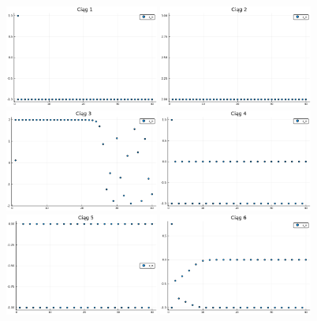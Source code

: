\documentclass{article}
\begin{document}
\begin{figure}
\includegraphics[width=0.45\textwidth]{img/t6plots/1.png}
\includegraphics[width=0.45\textwidth]{img/t6plots/2.png}
\includegraphics[width=0.45\textwidth]{img/t6plots/3.png}
\includegraphics[width=0.45\textwidth]{img/t6plots/4.png}
\includegraphics[width=0.45\textwidth]{img/t6plots/5.png}
\includegraphics[width=0.45\textwidth]{img/t6plots/6.png}

\end{figure}
\end{document}
